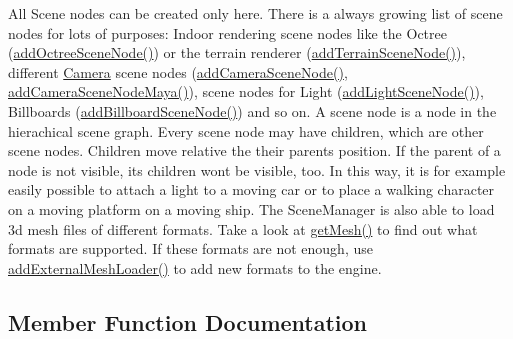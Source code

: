 All Scene nodes can be created only here. There is a always growing list of scene nodes for lots of purposes\+: Indoor rendering scene nodes like the Octree (\hyperlink{classirr_1_1scene_1_1ISceneManager_a503339385ca2b33d7e8035a61c4eca84}{add\+Octree\+Scene\+Node()}) or the terrain renderer (\hyperlink{classirr_1_1scene_1_1ISceneManager_a2188fb0443c7e0b6b69a673ca1d9ca5c}{add\+Terrain\+Scene\+Node()}), different \hyperlink{classCamera}{Camera} scene nodes (\hyperlink{classirr_1_1scene_1_1ISceneManager_afc3733849319078d5d22d94f58c7d1f2}{add\+Camera\+Scene\+Node()}, \hyperlink{classirr_1_1scene_1_1ISceneManager_a18e81a59e02231567ac938ea287fe523}{add\+Camera\+Scene\+Node\+Maya()}), scene nodes for Light (\hyperlink{classirr_1_1scene_1_1ISceneManager_a2e6442f8c95a544c355bd137ccdb7095}{add\+Light\+Scene\+Node()}), Billboards (\hyperlink{classirr_1_1scene_1_1ISceneManager_a00266a58b97e827acd9e105806a99c3a}{add\+Billboard\+Scene\+Node()}) and so on. A scene node is a node in the hierachical scene graph. Every scene node may have children, which are other scene nodes. Children move relative the their parents position. If the parent of a node is not visible, its children won\textquotesingle{}t be visible, too. In this way, it is for example easily possible to attach a light to a moving car or to place a walking character on a moving platform on a moving ship. The Scene\+Manager is also able to load 3d mesh files of different formats. Take a look at \hyperlink{classirr_1_1scene_1_1ISceneManager_a63894c3f3d46cfc385116f1705935e03}{get\+Mesh()} to find out what formats are supported. If these formats are not enough, use \hyperlink{classirr_1_1scene_1_1ISceneManager_a808972cc001db86c0576c38b3b3fbbf7}{add\+External\+Mesh\+Loader()} to add new formats to the engine. 

\subsection{Member Function Documentation}
\mbox{\label{classirr_1_1scene_1_1ISceneManager_a8e2e0cd3a27e85b4116855dd2f3365b8}} 
